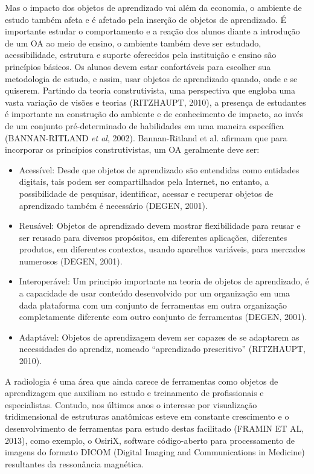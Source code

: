 \documentclass[12pt,openright,oneside,a4paper,english,french,spanish,brazil]{unifil}
\begin{document}
Mas o impacto dos objetos de aprendizado vai além da economia, o ambiente de estudo também afeta e é afetado pela inserção de objetos de aprendizado. É importante estudar o comportamento e a reação dos alunos diante a introdução de um OA ao meio de ensino, o ambiente também deve ser estudado, acessibilidade, estrutura e suporte oferecidos pela instituição e ensino são princípios básicos. Os  alunos devem estar confortáveis para escolher sua metodologia de estudo, e assim, usar objetos de aprendizado quando, onde e se quiserem. Partindo da teoria construtivista, uma perspectiva que engloba uma vasta variação de visões e teorias (\uppercase{Ritzhaupt}, 2010), a presença de estudantes é importante na construção do ambiente e de conhecimento de impacto, ao invés de um conjunto pré-determinado de habilidades em uma maneira específica (\uppercase{Bannan-Ritland} \textit{et al}, 2002). Bannan-Ritland et al. afirmam que para incorporar os princípios construtivistas, um OA geralmente deve ser:
\begin{itemize}
\item Acessível: Desde que objetos de aprendizado são entendidas como entidades digitais, tais podem ser compartilhados pela Internet, no entanto, a possibilidade de pesquisar, identificar, acessar e recuperar objetos de aprendizado também é necessário (\uppercase{Degen}, 2001).
\item Reusável: Objetos de aprendizado devem mostrar flexibilidade para reusar e ser reusado para diversos propósitos, em diferentes aplicações, diferentes produtos, em diferentes contextos, usando aparelhos variáveis, para mercados numerosos (\uppercase{Degen}, 2001).
\item Interoperável: Um principio importante na teoria de objetos de aprendizado, é a capacidade de usar conteúdo desenvolvido por um organização em uma dada plataforma com um conjunto de ferramentas em outra organização completamente diferente com outro conjunto de ferramentas (\uppercase{Degen}, 2001).
\item Adaptável: Objetos de aprendizagem devem ser capazes de se adaptarem as necessidades do aprendiz, nomeado ``aprendizado prescritivo'' (\uppercase{Ritzhaupt}, 2010).
\end{itemize}

A radiologia é uma área que ainda carece de ferramentas como objetos de aprendizagem que auxiliam no estudo e treinamento de profissionais e especialistas. Contudo, nos últimos anos o interesse por visualização tridimensional de estruturas anatômicas esteve em constante crescimento e o desenvolvimento de ferramentas para estudo destas facilitado (\uppercase{Framin et al}, 2013), como exemplo, o OsiriX, software código-aberto para processamento de imagens do formato DICOM (Digital Imaging and Communications in Medicine) resultantes da ressonância magnética. 
\end{document}
